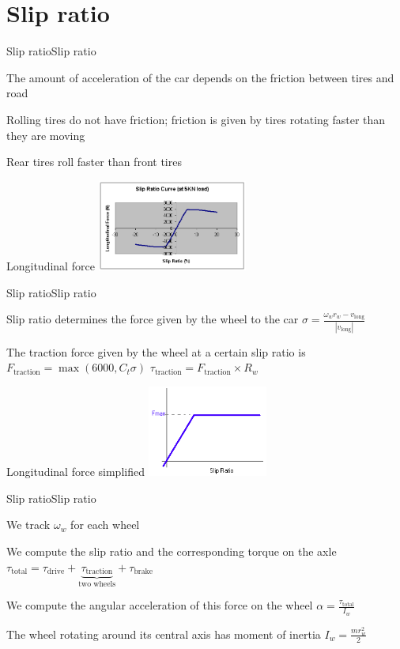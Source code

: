 \documentclass{beamer}
\begin{document}
\section{Slip ratio}
\begin{slide}{Slip ratio}{Slip ratio}{
\item The amount of acceleration of the car depends on the friction between tires and road
\item Rolling tires do not have friction; friction is given by tires rotating faster than they are moving
\item Rear tires roll faster than front tires
}\end{slide}

\begin{frame}{Longitudinal force}
\center
\includegraphics[height=3cm]{Pics/SlipRatioCurve.png}
\end{frame}

\begin{slide}{Slip ratio}{Slip ratio}{
\item Slip ratio determines the force given by the wheel to the car
$\sigma = \frac{\omega_w r_w - v_{\text{long}}}{|v_{\text{long}}|}$
\item The traction force given by the wheel at a certain slip ratio is
$F_{\text{traction}} = \max(6000, C_t \sigma)$
$\tau_{\text{traction}} = F_{\text{traction}} \times R_w$
}\end{slide}

\begin{frame}{Longitudinal force simplified}
\center
\includegraphics[height=3cm]{Pics/SlipRatioCurveApprox.png}
\end{frame}

\begin{slide}{Slip ratio}{Slip ratio}{
\item We track $\omega_w$ for each wheel
\item We compute the slip ratio and the corresponding torque on the axle
$\tau_{\text{total}} = \tau_{\text{drive}} + \underbrace{\tau_{\text{traction}}}_{\text{two wheels}} + \tau_{\text{brake}}$
\item We compute the angular acceleration of this force on the wheel
$\alpha = \frac{\tau_{\text{total}}}{I_w}$
\item The wheel rotating around its central axis has moment of inertia
$I_w = \frac{m r_w^2}{2}$
}\end{slide}
\end{document}
